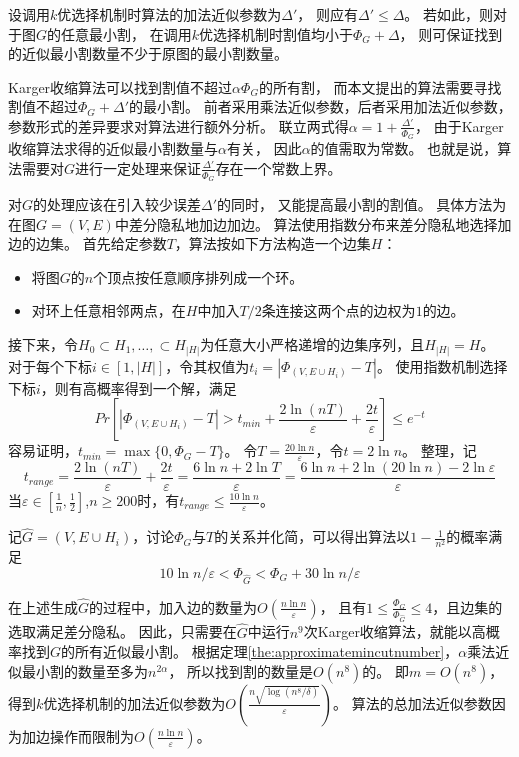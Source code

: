 设调用$k$优选择机制时算法的加法近似参数为$\Delta'$，
则应有$\Delta'\leq \Delta$。
若如此，则对于图$G$的任意最小割，
在调用$k$优选择机制时割值均小于$\Phi_G+\Delta$，
则可保证找到的近似最小割数量不少于原图的最小割数量。

Karger收缩算法可以找到割值不超过$\alpha\Phi_G$的所有割，
而本文提出的算法需要寻找割值不超过$\Phi_G+\Delta'$的最小割。
前者采用乘法近似参数，后者采用加法近似参数，
参数形式的差异要求对算法进行额外分析。
联立两式得$\alpha=1+\frac {\Delta'}{\Phi_G}$，
由于Karger收缩算法求得的近似最小割数量与$\alpha$有关，
因此$\alpha$的值需取为常数。
也就是说，算法需要对$G$进行一定处理来保证$\frac {\Delta'}{\Phi_G}$存在一个常数上界。

对$G$的处理应该在引入较少误差$\Delta'$的同时，
又能提高最小割的割值。
具体方法为在图$G=(V,E)$中差分隐私地加边加边。
算法使用指数分布来差分隐私地选择加边的边集。
首先给定参数$T$，算法按如下方法构造一个边集$H$：
\begin{itemize}
    \item 将图$G$的$n$个顶点按任意顺序排列成一个环。
    \item 对环上任意相邻两点，在$H$中加入$T/2$条连接这两个点的边权为$1$的边。
\end{itemize}
接下来，令$H_0\subset H_1,\ldots,\subset H_{|H|}$为任意大小严格递增的边集序列，且$H_{|H|}=H$。
对于每个下标$i\in[1,|H|]$，令其权值为$t_i=|\Phi_{(V,E\cup H_i)}-T|$。
使用指数机制选择下标$i$，则有高概率得到一个解，满足
\begin{equation}
    Pr[|\Phi_{(V,E\cup H_i)}-T|>t_{min}+\frac{2\ln (nT)}{\varepsilon}+\frac{2t}{\varepsilon}]\leq e^{-t}
\end{equation}
容易证明，$t_{min}=\max\{0,\Phi_G-T\}$。
令$T=\frac{20\ln n}{\varepsilon}$，令$t=2\ln n$。
整理，记
\begin{equation}
    t_{range}=\frac{2\ln (nT)}{\varepsilon}+\frac{2t}{\varepsilon}=\frac{6\ln n+2\ln T}{\varepsilon}= \frac{6\ln n+2\ln(20\ln n)-2\ln \varepsilon}{\varepsilon}
\end{equation}
当$\varepsilon\in[\frac1n,\frac12]$,$n\geq 200$时，有$t_{range}\leq \frac{10\ln n}{\varepsilon}$。

记$\hat G=(V,E\cup H_i)$，讨论$\Phi_G$与$T$的关系并化简，可以得出算法以$1-\frac1{n^2}$的概率满足
\begin{equation}
    10\ln n/\varepsilon<\Phi_{\hat G}<\Phi_G+30\ln n/\varepsilon
\end{equation}

在上述生成$\hat G$的过程中，加入边的数量为$O(\frac{n\ln n}{\varepsilon})$，
且有$1\leq \frac{\Phi_G}{\Phi_{\hat G}}\leq 4$，且边集的选取满足差分隐私。
因此，只需要在$\hat G$中运行$n^9$次Karger收缩算法，就能以高概率找到$G$的所有近似最小割。
根据定理\ref{the:approximatemincutnumber}，$\alpha$乘法近似最小割的数量至多为$n^{2\alpha}$，
所以找到割的数量是$O(n^8)$的。
即$m=O(n^8)$，得到$k$优选择机制的加法近似参数为$O(\frac{n\sqrt{\log(n^8/\delta)}}{\varepsilon})$。
算法的总加法近似参数因为加边操作而限制为$O(\frac{n\ln n}{\varepsilon})$。

